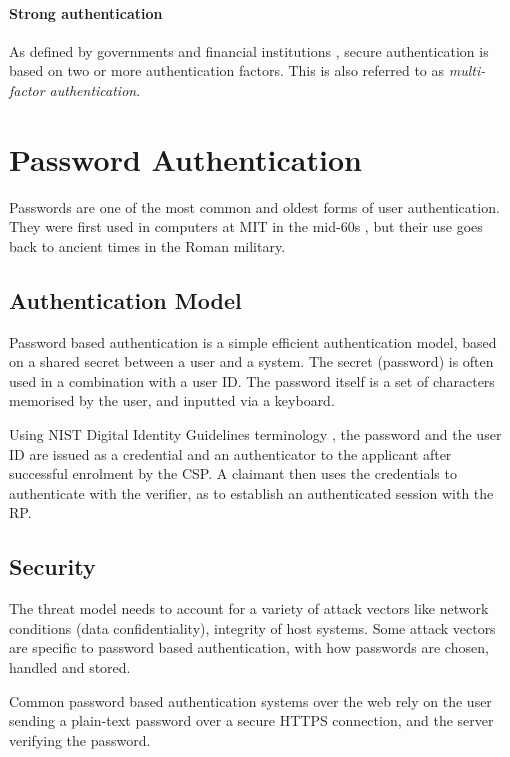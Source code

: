 \paragraph{Strong authentication} As defined by governments and financial institutions \cite{schaeffer2010national, ecb2013recommendations}, secure authentication is based on two or more authentication factors. 
This is also referred to as \textit{multi-factor authentication}.

\newpage
\section{Password Authentication}

Passwords are one of the most common and oldest forms of user authentication. 
They were first used in computers at MIT in the mid-60s \cite{mcmillan2012password}, but their use goes back to ancient times in the Roman military.

\subsection{Authentication Model}

Password based authentication is a simple efficient authentication model, based on a shared secret between a user and a system. 
The secret (password) is often used in a combination with a user ID. 
The password itself is a set of characters memorised by the user, and inputted via a keyboard.

Using NIST Digital Identity Guidelines terminology \cite{grassi2017}, the password and the user ID are issued as a credential and an authenticator to the applicant after successful enrolment by the CSP.
A claimant then uses the credentials to authenticate with the verifier, as to establish an authenticated session with the RP.


\subsection{Security}

The threat model needs to account for a variety of attack vectors like network conditions (data confidentiality), integrity of host systems.
Some attack vectors are specific to password based authentication, with how passwords are chosen, handled and stored.

Common password based authentication systems over the web rely on the user sending a plain-text password over a secure HTTPS connection, and the server verifying the password.

